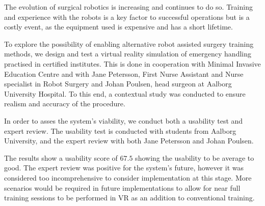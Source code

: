 The evolution of surgical robotics is increasing and continues to do so. Training and experience with the robots is a key factor to successful operations but is a costly event, as the equipment used is expensive and has a short lifetime.

To explore the possibility of enabling alternative robot assisted surgery training methods, we design and test a virtual reality simulation of emergency handling practised in certified institutes. This is done in cooperation with Minimal Invasive Education Centre and with Jane Petersson, First Nurse Assistant and Nurse specialist in Robot Surgery and Johan Poulsen, head surgeon at Aalborg University Hospital. To this end, a contextual study was conducted to ensure realism and accuracy of the procedure.

In order to asses the system's viability, we conduct both a usability test and expert review. The usability test is conducted with students from Aalborg University, and the expert review with both Jane Petersson and Johan Poulsen.

The results show a usability score of $67.5$ showing the usability to be average to good. The expert review was positive for the system's future, however it was considered too incomprehensive to consider implementation at this stage. More scenarios would be required in future implementations to allow for near full training sessions to be performed in VR as an addition to conventional training.